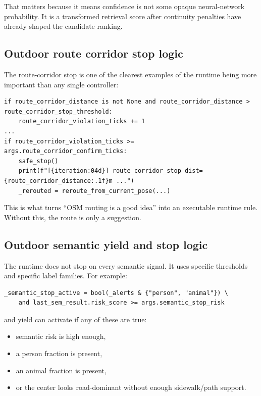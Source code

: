\documentclass[11pt]{article}
\begin{document}
That matters because it means confidence is not some opaque neural-network
probability. It is a transformed retrieval score after continuity penalties have
already shaped the candidate ranking.

\subsection{Outdoor route corridor stop logic}

The route-corridor stop is one of the clearest examples of the runtime being more
important than any single controller:

\begin{lstlisting}
if route_corridor_distance is not None and route_corridor_distance > route_corridor_stop_threshold:
    route_corridor_violation_ticks += 1
...
if route_corridor_violation_ticks >= args.route_corridor_confirm_ticks:
    safe_stop()
    print(f"[{iteration:04d}] route_corridor_stop dist={route_corridor_distance:.1f}m ...")
    _rerouted = reroute_from_current_pose(...)
\end{lstlisting}

This is what turns ``OSM routing is a good idea'' into an executable runtime rule.
Without this, the route is only a suggestion.

\subsection{Outdoor semantic yield and stop logic}

The runtime does not stop on every semantic signal. It uses specific thresholds and
specific label families. For example:

\begin{lstlisting}
_semantic_stop_active = bool(_alerts & {"person", "animal"}) \
    and last_sem_result.risk_score >= args.semantic_stop_risk
\end{lstlisting}

and yield can activate if any of these are true:

\begin{itemize}[nosep]
  \item semantic risk is high enough,
  \item a person fraction is present,
  \item an animal fraction is present,
  \item or the center looks road-dominant without enough sidewalk/path support.
\end{itemize}
\end{document}
